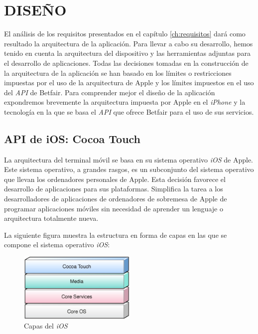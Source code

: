 \chapter{DISEÑO}
\label{ch:diseno}
 
  El análisis de los requisitos presentados en el capítulo \ref{ch:requisitos} dará como resultado la arquitectura de la aplicación. Para llevar a cabo su desarrollo, hemos tenido en cuenta la arquitectura del dispositivo y las herramientas adjuntas para el desarrollo de aplicaciones. Todas las decisiones tomadas en la construcción de la arquitectura de la aplicación se han basado en los límites o restricciones impuestas por el uso de la arquitectura de Apple y los límites impuestos en el uso del \emph{API} de Betfair. Para comprender mejor el diseño de la aplicación expondremos brevemente la arquitectura impuesta por Apple en el \emph{iPhone} y la tecnología en la que se basa el \emph{API} que ofrece Betfair para el uso de sus servicios.

\section{API de iOS: Cocoa Touch}
 La arquitectura del terminal móvil se basa en su sistema operativo \emph{iOS} de Apple. Este sistema operativo, a grandes rasgos, es un subconjunto del sistema operativo que llevan los ordenadores personales de Apple. Esta decisión favorece el desarrollo de aplicaciones para sus plataformas. Simplifica la tarea a los desarrolladores de aplicaciones de ordenadores de sobremesa de Apple de programar aplicaciones móviles sin necesidad de aprender un lenguaje o arquitectura totalmente nueva.
 

\noindent
La siguiente figura muestra la estructura en forma de capas en las que se compone el sistema operativo \emph{iOS}:


\begin{figure} [h]
  \centering
    \includegraphics[width=0.5\textwidth]{./images/overview_systemlayers.jpg}
  \caption{Capas del \emph{iOS}}
  \label{fig:Capas-del-iOS}
\end{figure}


